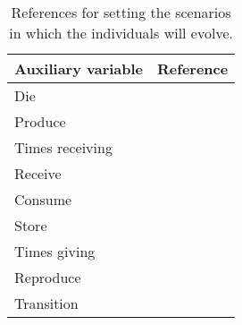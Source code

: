 \documentclass{article}
\begin{document}
\begin{table}[H]
    \centering
    \caption{References for setting the scenarios in which the individuals will evolve.}
    \begin{tabular}{ l r }
    \hline
    Auxiliary variable & Reference \\ 
    \hline
    Die & \cite{gurven2007longevity} \\  
    Produce & \cite{koster2020life} \\  
    Times receiving & \cite{gurven2004give} \\  
    Receive & \cite{gurven2004give} \\  
    Consume & \cite{kaplan2000theory,pontzer2021daily} \\  
    Store & \cite{bowles2011cultivation} \\  
    Times giving & \cite{gurven2004give} \\  
    Reproduce & \cite{wood2017dynamics} \\  
    Transition & \cite{mulder1989menarche,kramer2010teen,wood2017dynamics,laisk2019demographic} \\
    \hline
    \end{tabular}
    \label{tab:2}
\end{table}

\clearpage



\end{document}

